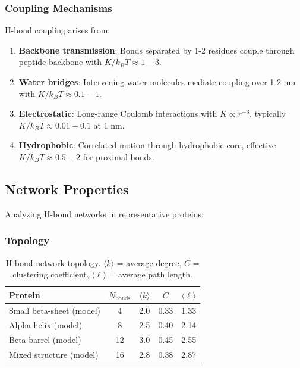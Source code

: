 \subsubsection{Coupling Mechanisms}

H-bond coupling arises from:

\begin{enumerate}
\item \textbf{Backbone transmission}: Bonds separated by 1-2 residues couple through peptide backbone with $K/k_B T \approx 1-3$.

\item \textbf{Water bridges}: Intervening water molecules mediate coupling over 1-2 nm with $K/k_B T \approx 0.1-1$.

\item \textbf{Electrostatic}: Long-range Coulomb interactions with $K \propto r^{-3}$, typically $K/k_B T \approx 0.01-0.1$ at 1 nm.

\item \textbf{Hydrophobic}: Correlated motion through hydrophobic core, effective $K/k_B T \approx 0.5-2$ for proximal bonds.
\end{enumerate}

\subsection{Network Properties}

Analyzing H-bond networks in representative proteins:

\subsubsection{Topology}

\begin{table}[h]
\centering
\begin{tabular}{|l|c|c|c|c|}
\hline
\textbf{Protein} & $N_{\text{bonds}}$ & $\langle k \rangle$ & $C$ & $\langle \ell \rangle$ \\
\hline
Small beta-sheet (model) & 4 & 2.0 & 0.33 & 1.33 \\
Alpha helix (model) & 8 & 2.5 & 0.40 & 2.14 \\
Beta barrel (model) & 12 & 3.0 & 0.45 & 2.55 \\
Mixed structure (model) & 16 & 2.8 & 0.38 & 2.87 \\
\hline
\end{tabular}
\caption{H-bond network topology. $\langle k \rangle$ = average degree, $C$ = clustering coefficient, $\langle \ell \rangle$ = average path length.}
\end{table}

